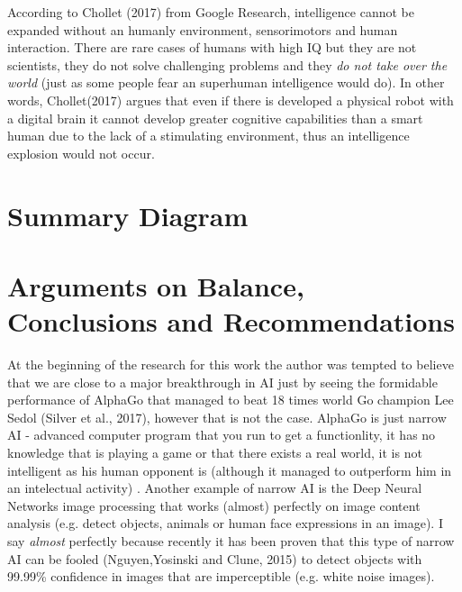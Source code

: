 \documentclass[11pt]{article}
\begin{document}
\indent
	According to Chollet (2017) from Google Research, intelligence cannot be expanded without an humanly environment, sensorimotors and human interaction. There are rare cases of humans with high IQ but they are not scientists, they do not solve challenging problems and they \textit{do not take over the world} (just as some people fear an superhuman intelligence would do). In other words, Chollet(2017) argues that even if there is developed a physical robot with a digital brain it cannot develop greater cognitive capabilities than a smart human due to the lack of a stimulating environment, thus an intelligence explosion would not occur. 
\newpage
\section*{Summary Diagram}

\newpage	
\section*{Arguments on Balance, Conclusions and Recommendations}
	At the beginning of the research for this work the author was tempted to believe that we are close to a major breakthrough in AI just by seeing the formidable performance of AlphaGo that managed to beat 18 times world Go champion Lee Sedol (Silver et al., 2017), however that is not the case. AlphaGo is just narrow AI - advanced computer program that you run to get a functionlity, it has no knowledge that is playing a game or that there exists a real world, it is not intelligent as his human opponent is (although it managed to outperform him in an intelectual activity)
. Another example of narrow AI is the Deep Neural Networks image processing that works (almost) perfectly on image content analysis (e.g. detect objects, animals or human face expressions in an image). I say \textit{almost}  perfectly because recently it has been proven that this type of narrow AI can be fooled (Nguyen,Yosinski and Clune, 2015) to detect objects with 99.99\% confidence in images that are imperceptible (e.g. white noise images). \\ 
\end{document}
